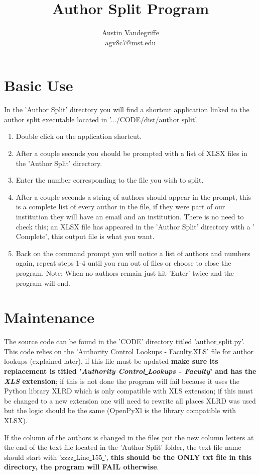 \documentclass{article}
\title{Author Split Program}
\author{Austin Vandegriffe\\[.5em] agv8c7@mst.edu}
\begin{document}
\maketitle


\section{Basic Use}
  \begin{adjustwidth}{3em}{}
      In the 'Author Split' directory you will find a shortcut application linked to the author split executable located in '.../CODE/dist/author\underline{ }split'.
      \begin{enumerate}
      \item Double click on the application shortcut.
      \item After a couple seconds you should be prompted with a list of XLSX files in the 'Author Split' directory.
      \item Enter the number corresponding to the file you wish to split.
      \item After a couple seconds a string of authors should appear in the prompt, this is a complete list of every author in the file, if they were part of our institution they will have an email and an institution. There is no need to check this; an XLSX file has appeared in the 'Author Split' directory with a '\underline{ }Complete', this output file is what you want.
      \item Back on the command prompt you will notice a list of authors and numbers again, repeat steps 1-4 until you run out of files or choose to close the program. Note: When no authors remain just hit 'Enter' twice and the program will end.
      \end{enumerate}
  \end{adjustwidth}

\section{Maintenance}
	\begin{adjustwidth}{3em}{}
		The source code can be found in the 'CODE' directory titled 'author\underline{ }split.py'. This code relies on the 'Authority Control\underline{ }Lookups - Faculty.XLS' file for author lookups (explained later), if this file must be updated \textbf{make sure its replacement is titled '\textit{Authority Control\underline{ }Lookups - Faculty}' and has the \textit{XLS} extension}; if this is not done the program will fail because it uses the Python library XLRD which is only compatible with XLS extension; if this must be changed to a new extension one will need to rewrite all places XLRD was used but the logic should be the same (OpenPyXl is the library compatible with XLSX).\par
        If the column of the authors is changed in the files put the new column letters at the end of the text file located in the 'Author Split' folder, the text file name should start with 'zzzz\underline{ }Line\underline{ }155\underline{ }', \textbf{this should be the ONLY txt file in this directory, the program will FAIL otherwise}.
	\end{adjustwidth}
\end{document}
